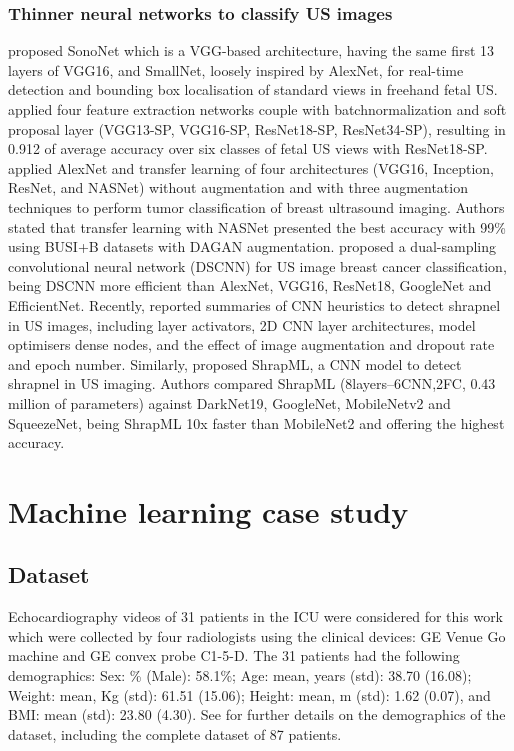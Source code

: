 \documentclass[mlabstract,twocolumn]{jmlr}
\begin{document}
\subsubsection{Thinner neural networks to classify US images} \label{subsec:thinnerNets}
\citet{baumgartner2017-IEEETransMedImag} proposed SonoNet which is a VGG-based architecture, having the same first 13 layers of VGG16, and SmallNet, loosely inspired by AlexNet, for real-time detection and bounding box localisation of standard views in freehand fetal US.
\citet{toussaint2018-MICCAI} applied four feature extraction networks couple with batchnormalization and soft proposal layer (VGG13-SP, VGG16-SP, ResNet18-SP, ResNet34-SP), resulting in 0.912 of average accuracy over six classes of fetal US views with ResNet18-SP.
\citet{Al-Dhabyani2019-IJACSA} applied AlexNet and transfer learning of four architectures (VGG16, Inception, ResNet, and NASNet) without augmentation and with three augmentation techniques to perform tumor classification of breast ultrasound imaging.
Authors stated that transfer learning with NASNet presented the best accuracy with 99\% using BUSI+B datasets with DAGAN augmentation.
\citet{xie2020-physics-in-medicine-biology} proposed a dual-sampling convolutional neural network (DSCNN) for US image breast cancer classification, being DSCNN more efficient than AlexNet, VGG16, ResNet18, GoogleNet and EfficientNet.
Recently, \citet{snider2022-ScientificReports} reported summaries of CNN heuristics to detect shrapnel in US images, including layer activators, 2D CNN layer architectures, model optimisers dense nodes, and the effect of image augmentation and dropout rate and epoch number.
Similarly, \citet{boice2022-in-jimaging} proposed ShrapML, a CNN model to detect shrapnel in US imaging.
Authors compared ShrapML (8layers--6CNN,2FC, 0.43 million of parameters) against DarkNet19, GoogleNet, MobileNetv2 and SqueezeNet, being ShrapML 10x faster than MobileNet2 and offering the highest accuracy.

\section{Machine learning case study}
\subsection{Dataset}
Echocardiography videos of 31 patients in the ICU were considered for this work which were collected by four radiologists using the clinical devices: GE Venue Go machine and GE convex probe C1-5-D.
The 31 patients had the following demographics:
Sex: \% (Male): 58.1\%;
Age: mean, years (std): 38.70 (16.08);
Weight: mean, Kg (std): 61.51 (15.06);
Height: mean, m (std): 1.62 (0.07), and 
BMI: mean (std): 23.80 (4.30).
See  for further details on the demographics of the dataset, including the complete dataset of 87 patients.
\end{document}
